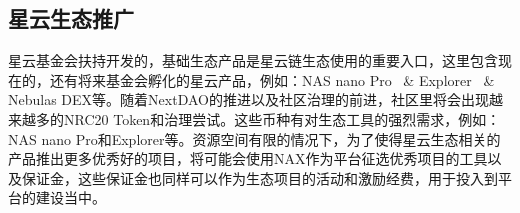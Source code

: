 \subsection{星云生态推广}
星云基金会扶持开发的，基础生态产品是星云链生态使用的重要入口，这里包含现在的，还有将来基金会孵化的星云产品，例如：NAS nano Pro~\cite{NASnano} \& Explorer~\cite{explorer} \& Nebulas DEX等。随着NextDAO的推进以及社区治理的前进，社区里将会出现越来越多的NRC20 Token和治理尝试。这些币种有对生态工具的强烈需求，例如：NAS nano Pro和Explorer等。资源空间有限的情况下，为了使得星云生态相关的产品推出更多优秀好的项目，将可能会使用NAX作为平台征选优秀项目的工具以及保证金，这些保证金也同样可以作为生态项目的活动和激励经费，用于投入到平台的建设当中。
